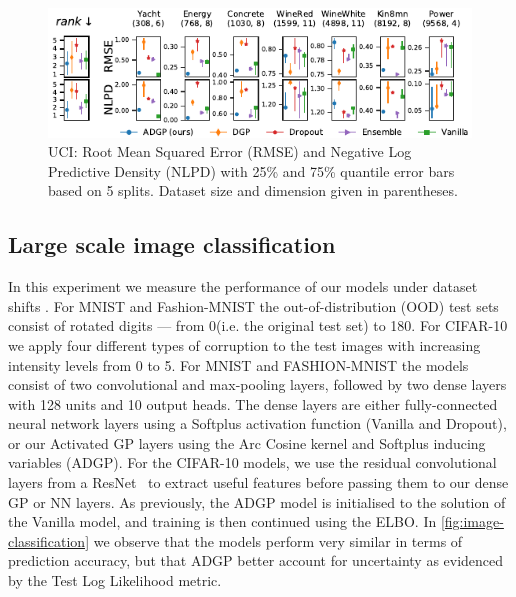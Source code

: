 \begin{figure}
    \centering
    \includegraphics[width=\textwidth]{uci_small}
    \caption{UCI: Root Mean Squared Error (RMSE) and Negative Log Predictive Density (NLPD) with 25\% and 75\% quantile error bars based on 5 splits. Dataset size and dimension given in parentheses.}
    \label{fig:uci}
\end{figure}

\subsection{Large scale image classification}
In this experiment we measure the performance of our models under dataset shifts \citep{Ovadia2019}. For MNIST and Fashion-MNIST the out-of-distribution (OOD) test sets consist of rotated digits --- from 0\textdegree (i.e. the original test set) to 180\textdegree. For CIFAR-10 we apply four different types of corruption to the test images with increasing intensity levels from 0 to 5. For MNIST and FASHION-MNIST the models consist of two convolutional and max-pooling layers, followed by two dense layers with 128 units and 10 output heads. The dense layers are either fully-connected neural network layers using a Softplus activation function (Vanilla and Dropout), or our Activated GP layers using the Arc Cosine kernel and Softplus inducing variables (ADGP). For the CIFAR-10 models, we use the residual convolutional layers from a ResNet~\citep{he2016deep} to extract useful features before passing them to our dense GP or NN layers. As previously, the ADGP model is initialised to the solution of the Vanilla model, and training is then continued using the ELBO. In \cref{fig:image-classification} we observe that the models perform very similar in terms of prediction accuracy, but that ADGP better account for uncertainty as evidenced by the Test Log Likelihood metric.%

